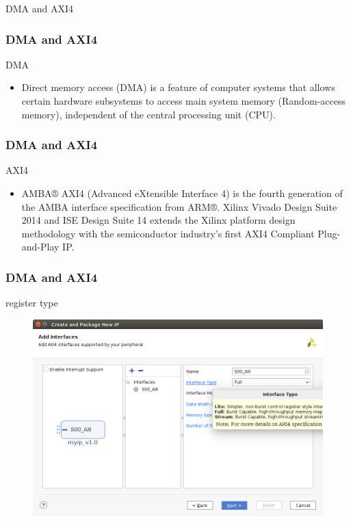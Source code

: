 \documentclass{beamer}
\begin{document}
\begin{frame}
\centering DMA and AXI4
\end{frame}

\begin{frame}
\frametitle{DMA and AXI4}
\centering DMA
\centering \\
\begin{itemize}
\item Direct memory access (DMA) is a feature of computer systems that allows certain hardware subsystems to access main system memory (Random-access memory), independent of the central processing unit (CPU).
\end{itemize}
\end{frame}

\begin{frame}
\frametitle{DMA and AXI4}
\centering AXI4
\centering \\
\begin{itemize}
\item AMBA® AXI4 (Advanced eXtensible Interface 4) is the fourth generation of the AMBA interface specification from ARM®. Xilinx Vivado Design Suite 2014 and ISE Design Suite 14 extends the Xilinx platform design methodology with the semiconductor industry's first AXI4 Compliant Plug-and-Play IP.
\end{itemize}
\end{frame}

\begin{frame}[fragile]
\frametitle{DMA and AXI4}
\centering register type\\
\begin{figure}
\centering\includegraphics[scale=0.35]{register-type.png}
\end{figure}
\begin{verbatim}
\end{verbatim}
\end{frame}
\end{document}
